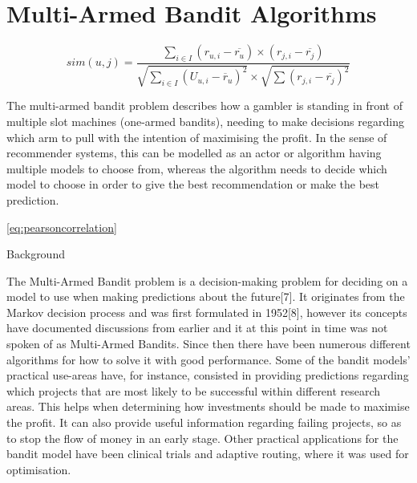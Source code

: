 \chapter{Multi-Armed Bandit Algorithms}

\begin{equation}
\label{eq:pearsoncorrelation} \tag{23}
sim(u, j)
 = \frac{\sum_{i \in I}\left(r_{u,i} - \overline{r_{u}} \right ) \times \left ( r_{j,i} - \overline{r_{j}} \right)}{\sqrt{\sum_{i \in I}\left(U_{u, i} - \overline{r}_{u}\right)^{2}}\times\sqrt{\sum\left(r_{j,i}-\overline{r_{j}}\right)^{2}}}
\end{equation}


\begin{figure}[h]
    {\par}
\end{figure}

The multi-armed bandit problem describes how a gambler is standing in front of multiple slot machines (one-armed bandits), needing to make decisions regarding which arm to pull with the intention of maximising the profit.
In the sense of recommender systems, this can be modelled as an actor or algorithm having multiple models to choose from, whereas the algorithm needs to decide which model to choose in order to give the best recommendation or make the best prediction.

\eqref{eq:pearsoncorrelation}


Background

The Multi-Armed Bandit problem is a decision-making problem for deciding on a model
to use when making predictions about the future[7]. It originates from the Markov decision process and was first formulated in 1952[8], however its concepts have documented
discussions from earlier and it at this point in time was not spoken of as Multi-Armed
Bandits. Since then there have been numerous different algorithms for how to solve it
with good performance.
Some of the bandit models’ practical use-areas have, for instance, consisted in providing
predictions regarding which projects that are most likely to be successful within different
research areas. This helps when determining how investments should be made to maximise the profit. It can also provide useful information regarding failing projects, so as
to stop the flow of money in an early stage. Other practical applications for the bandit
model have been clinical trials and adaptive routing, where it was used for optimisation.

